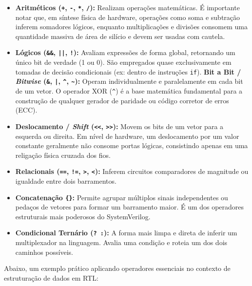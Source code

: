 \documentclass[12pt,a4paper]{article}
\begin{document}
\begin{itemize}
    \item \textbf{Aritméticos (\texttt{+}, \texttt{-}, \texttt{*}, \texttt{/}):} Realizam operações matemáticas. É importante notar que, em síntese física de hardware, operações como soma e subtração inferem somadores lógicos, enquanto multiplicações e divisões consomem uma quantidade massiva de área de silício e devem ser usadas com cautela.
    \item \textbf{Lógicos (\texttt{\&\&}, \texttt{||}, \texttt{!}):} Avaliam expressões de forma global, retornando um único bit de verdade (1 ou 0). São empregados quase exclusivamente em tomadas de decisão condicionais (ex: dentro de instruções \texttt{if}).
    \textbf{Bit a Bit / \textit{Bitwise} (\texttt{\&}, \texttt{|}, \texttt{\^}, \texttt{\~}):} Operam individualmente e paralelamente em cada bit de um vetor. O operador XOR (\texttt{\^}) é a base matemática fundamental para a construção de qualquer gerador de paridade ou código corretor de erros (ECC).
    \item \textbf{Deslocamento / \textit{Shift} (\texttt{<<}, \texttt{>>}):} Movem os bits de um vetor para a esquerda ou direita. Em nível de hardware, um deslocamento por um valor constante geralmente não consome portas lógicas, consistindo apenas em uma religação física cruzada dos fios.
    \item \textbf{Relacionais (\texttt{==}, \texttt{!=}, \texttt{>}, \texttt{<}):} Inferem circuitos comparadores de magnitude ou igualdade entre dois barramentos.
    \item \textbf{Concatenação \texttt{\{\}}:} Permite agrupar múltiplos sinais independentes ou pedaços de vetores para formar um barramento maior. É um dos operadores estruturais mais poderosos do SystemVerilog.
    \item \textbf{Condicional Ternário (\texttt{? :}):} A forma mais limpa e direta de inferir um multiplexador na linguagem. Avalia uma condição e roteia um dos dois caminhos possíveis.
\end{itemize}

Abaixo, um exemplo prático aplicando operadores essenciais no contexto de estruturação de dados em RTL:
\end{document}
